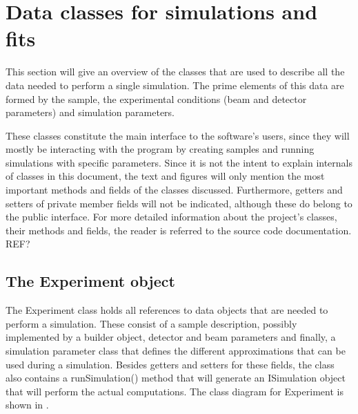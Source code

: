 

\section{Data classes for simulations and fits}
This section will give an overview of the classes that are used to describe all the data needed to perform a single simulation. The prime elements of this data are formed by the sample, the experimental conditions (beam and detector parameters) and simulation parameters.

These classes constitute the main interface to the software's users, since they will mostly be interacting with the program by creating samples and running simulations with specific parameters. Since it is not the intent to explain internals of classes in this document, the text and figures will only mention the most important methods and fields of the classes discussed. Furthermore, getters and setters of private member fields will not be indicated, although these do belong to the public interface. For more detailed information about the project's classes, their methods and fields, the reader is referred to the source code documentation. REF?

\subsection{The Experiment object}
The Experiment class holds all references to data objects that are needed to perform a simulation. These consist of a sample description, possibly implemented by a builder object, detector and beam parameters and finally, a simulation parameter class that defines the different approximations that can be used during a simulation. Besides getters and setters for these fields, the class also contains a runSimulation() method that will generate an ISimulation object that will perform the actual computations. The class diagram for Experiment is shown in .

